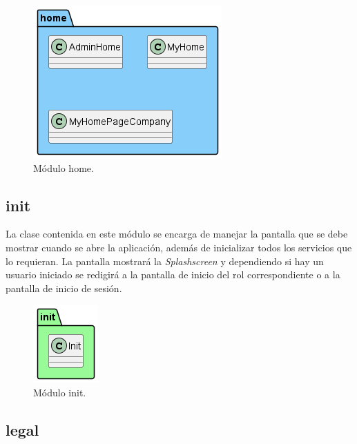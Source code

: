 \documentclass[a4paper, 12pt]{article}
\begin{document}
\begin{figure}[H]
	\begin{center}
		{\includegraphics[width=0.8\linewidth]{diagram/Home.png}\par}
		\caption{Módulo home.}
	\end{center}
\end{figure}


\subsection*{init}

La clase contenida en este módulo se encarga de manejar la pantalla que se debe mostrar cuando se abre la aplicación, además de inicializar todos los servicios que lo requieran. La pantalla mostrará la \textit{Splashscreen} y dependiendo si hay un usuario iniciado se redigirá a la pantalla de inicio del rol correspondiente o a la pantalla de inicio de sesión.

\begin{figure}[H]
	\begin{center}
		{\includegraphics[]{diagram/Init.png}\par}
		\caption{Módulo init.}
	\end{center}
\end{figure}


\subsection*{legal}
\end{document}
